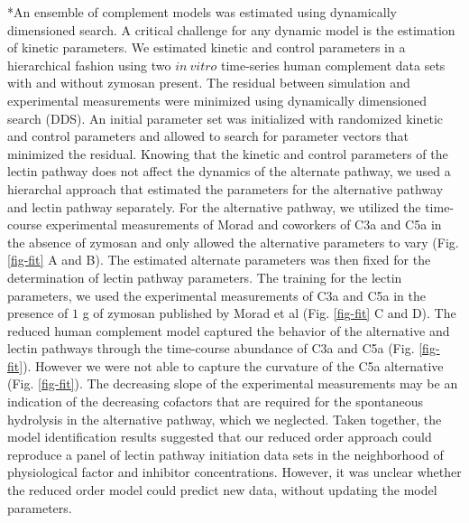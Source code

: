 \documentclass[12pt]{article}
\makeatletter
\renewcommand\subsection{\@startsection
	{subsection}{2}{0mm}
	{-0.05in}
	{-0.5\baselineskip}
	{\normalfont\normalsize\bfseries}}
\makeatother
\begin{document}
\subsection*{An ensemble of complement models was estimated using dynamically dimensioned search.}
A critical challenge for any dynamic model is the estimation of kinetic parameters. We estimated
kinetic and control parameters in a hierarchical fashion using  two $in~vitro$ time-series human complement data sets with and without zymosan present. The residual between simulation and experimental measurements were minimized  using dynamically dimensioned search (DDS). An initial parameter set was initialized with randomized kinetic and control parameters and allowed to search for parameter vectors that minimized the residual. Knowing that the kinetic and control parameters of the lectin pathway does not affect the dynamics of the alternate pathway, we used a hierarchal approach that estimated the parameters for the alternative pathway and lectin pathway separately. For the alternative pathway, we utilized the time-course experimental measurements of Morad and coworkers \cite{morad2015time} of C3a and C5a in the absence of zymosan and only allowed the alternative parameters to vary (Fig. \ref{fig-fit} A and B). The estimated alternate parameters was then fixed for the determination of lectin pathway parameters. The training for the lectin parameters, we used the experimental measurements of C3a and C5a in the presence of $1$ g of zymosan published by Morad et al \cite{morad2015time} (Fig. \ref{fig-fit} C and D).
The reduced human complement model captured the behavior of the alternative and lectin pathways through the time-course abundance of C3a and C5a (Fig. \ref{fig-fit}).
However we were not able to capture the curvature of the C5a alternative (Fig. \ref{fig-fit}).
The decreasing slope of the experimental measurements may be an indication of the decreasing cofactors that are required for the spontaneous hydrolysis in the alternative pathway, which we neglected.  Taken together, the model identification results suggested that our reduced order approach could reproduce a panel of lectin pathway initiation data sets in the neighborhood of physiological factor and inhibitor concentrations. However, it was unclear whether the reduced order model could predict new data, without updating the model parameters.
\end{document}
